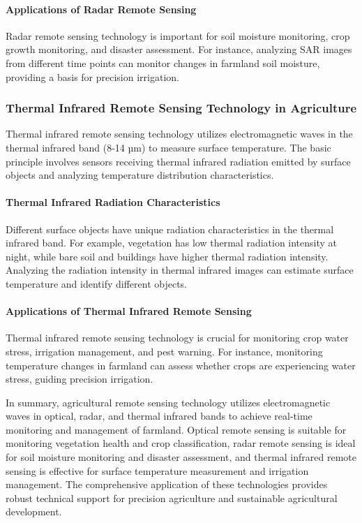 \paragraph{Applications of Radar Remote Sensing} Radar remote sensing technology is important for soil moisture monitoring, crop growth monitoring, and disaster assessment. For instance, analyzing SAR images from different time points can monitor changes in farmland soil moisture, providing a basis for precision irrigation.

\subsubsection{Thermal Infrared Remote Sensing Technology in Agriculture}

Thermal infrared remote sensing technology utilizes electromagnetic waves in the thermal infrared band (8-14 µm) to measure surface temperature. The basic principle involves sensors receiving thermal infrared radiation emitted by surface objects and analyzing temperature distribution characteristics.

\paragraph{Thermal Infrared Radiation Characteristics} Different surface objects have unique radiation characteristics in the thermal infrared band. For example, vegetation has low thermal radiation intensity at night, while bare soil and buildings have higher thermal radiation intensity. Analyzing the radiation intensity in thermal infrared images can estimate surface temperature and identify different objects.

\paragraph{Applications of Thermal Infrared Remote Sensing} Thermal infrared remote sensing technology is crucial for monitoring crop water stress, irrigation management, and pest warning. For instance, monitoring temperature changes in farmland can assess whether crops are experiencing water stress, guiding precision irrigation.

In summary, agricultural remote sensing technology utilizes electromagnetic waves in optical, radar, and thermal infrared bands to achieve real-time monitoring and management of farmland. Optical remote sensing is suitable for monitoring vegetation health and crop classification, radar remote sensing is ideal for soil moisture monitoring and disaster assessment, and thermal infrared remote sensing is effective for surface temperature measurement and irrigation management. The comprehensive application of these technologies provides robust technical support for precision agriculture and sustainable agricultural development.
